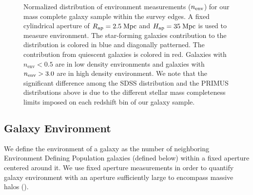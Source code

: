 \documentclass{emulateapj}
\def \apradius{2.5}
\def \apheight{35}
\begin{document}
\begin{figure}
  \begin{center}
    \leavevmode
    \caption{Normalized distribution of environment measurements ($n_{\rm{env}}$) for our mass complete galaxy sample within the survey edges. A fixed cylindrical aperture of $R_{\rm{ap}} =\apradius\;\rm{Mpc}$ and $H_{\rm{ap}} = \apheight\; \rm{Mpc}$ is used to measure environment. The star-forming galaxies contribution to the distribution is colored in blue and diagonally patterned. The contribution from quiescent galaxies is colored in red. Galaxies with $n_{\mathrm{env}} < 0.5$ are in low density environments and galaxies with $n_{\rm{env}} > 3.0$ are in high density environment. We note that the significant difference among the SDSS distribution and the PRIMUS distributions above is due to the different stellar mass completeness limits imposed on each redshift bin of our galaxy sample.}      \label{fig:envcount}
    \end{center}
\end{figure}

\subsection{Galaxy Environment} \label{sec:environment}
We define the environment of a galaxy as the number of neighboring Environment Defining Population galaxies (defined below) within a fixed aperture centered around it. We use fixed aperture measurements in order to quantify galaxy environment with an aperture sufficiently large to encompass massive halos (\citealt{Muldrew:2012aa, Skibba:2013aa}).
\end{document}
